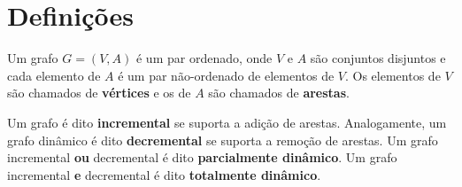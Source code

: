 \chapter{Definições}
\label{cap:definicoes}

Um grafo \(G = (V, A)\) é um par ordenado, onde \(V\) e \(A\) são conjuntos disjuntos e cada elemento de \(A\) é um par não-ordenado de elementos de \(V\). Os elementos de \(V\) são chamados de \textbf{vértices} e os de \(A\) são chamados de \textbf{arestas}.

Um grafo é dito \textbf{incremental} se suporta a adição de arestas. Analogamente, um grafo dinâmico é dito \textbf{decremental} se suporta a remoção de arestas. Um grafo incremental \textbf{ou} decremental é dito \textbf{parcialmente dinâmico}. Um grafo incremental \textbf{e} decremental é dito \textbf{totalmente dinâmico}.

